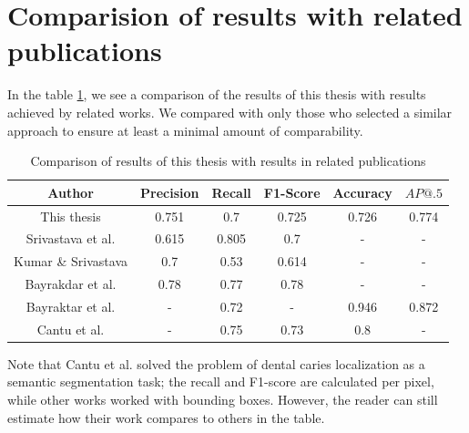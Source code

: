 \section{Comparision of results with related publications}
\label{sec:result_comparision_with_lit}
In the table \ref{tab:results_comparison}, we see a comparison of the results of this thesis with results achieved by related works. We compared with only those who selected a similar approach to ensure at least a minimal amount of comparability.

\begin{table}
    \centering
    \begin{tabular}{|c|c|c|c|c|c|}
        \hline
        Author                                                                 & Precision & Recall & F1-Score & Accuracy & $AP@.5$ \\ \hline
        This thesis                                                            & 0.751     & 0.7    & 0.725    & 0.726    & 0.774   \\ \hline
        Srivastava et al. \cite{Srivastava2017}                                & 0.615     & 0.805  & 0.7      & -        & -       \\ \hline
        Kumar                                   \& Srivastava \cite{Kumar2018} & 0.7       & 0.53   & 0.614    & -        & -       \\ \hline
        Bayrakdar et al. \cite{Bayrakdar2021}                                  & 0.78      & 0.77   & 0.78     & -        & -       \\ \hline
        Bayraktar et al. \cite{Bayraktar2021}                                  & -         & 0.72   & -        & 0.946    & 0.872   \\ \hline
        Cantu et al. \cite{Cantu2020}                                          & -         & 0.75   & 0.73     & 0.8      & -       \\ \hline
    \end{tabular}
    \caption{Comparison of results of this thesis with results in related publications}
    \label{tab:results_comparison}
\end{table}

Note that Cantu et al. \cite{Cantu2020} solved the problem of dental caries localization as a semantic segmentation task; the recall and F1-score are calculated per pixel, while other works worked with bounding boxes. However, the reader can still estimate how their work compares to others in the table.














